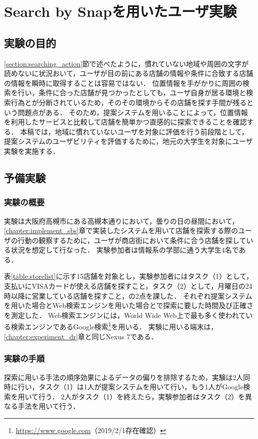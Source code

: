 \chapter{Search by Snapを用いたユーザ実験}
\section{実験の目的}
  \ref{section:searching_action}節で述べたように，慣れていない地域や周囲の文字が読めないに状況おいて，ユーザが目の前にある店舗の情報や条件に合致する店舗の情報を瞬時に取得することは容易ではない．
  位置情報を手がかりに周囲の検索を行い，条件に合った店舗が見つかったとしても，ユーザ自身が居る環境と検索行為とが分断されているため，そのその環境からその店舗を探す手間が残るという問題点がある．
  そのため，提案システムを用いることによって，位置情報を利用したサービスと比較して店舗を簡単かつ直感的に探索できることを確認する．
  本稿では，地域に慣れていないユーザを対象に評価を行う前段階として，提案システムのユーザビリティを評価するために，地元の大学生を対象にユーザ実験を実施する．

\section{予備実験}
  \subsection{実験の概要}
    実験は大阪府高槻市にある高槻本通りにおいて，曇りの日の昼間において，\ref{chapter:implement_sbs}章で実装したシステムを用いて店舗を探索する際のユーザの行動の観察するために，ユーザが商店街において条件に合う店舗を探している状況を想定して行なった．
    実験参加者は情報系の学部に通う大学生4名である．

    表\ref{table:storelist}に示す15店舗を対象とし，実験参加者にはタスク（1）として，支払いにVISAカードが使える店舗を探すこと，タスク（2）として，月曜日の24時以降に営業している店舗を探すこと，の2点を課した．
    それぞれ提案システムを用いた場合とWeb検索エンジンを用いた場合とで探索に要した時間及び正確さを測定した．
    Web検索エンジンには，World Wide Web上で最も多く使われている検索エンジン\cite{Alexa:2019}であるGoogle検索\footnote{\url{https://www.google.com}（2019/2/1存在確認）}を用いる．
    実験に用いる端末は，\ref{chapter:experiment_dr}章と同じNexus 7である．
    
  \subsection{実験の手順}
    探索に用いる手法の順序効果によるデータの偏りを排除するため，実験は2人同時に行い，タスク（1）は1人が提案システムを用いて行い，もう1人がGoogle検索を用いて行う．
    2人がタスク（1）を終えたら，実験参加者はタスク（2）を異なる手法を用いて行う．

